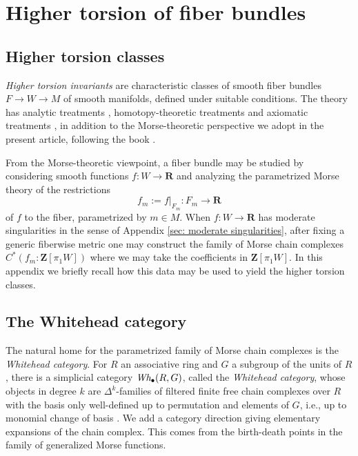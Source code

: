\documentclass{amsart}
\def\bR{\mathbf{R}}
\def\bZ{\mathbf{Z}}
\theoremstyle{definition}
\theoremstyle{remark}
\newtheorem{inductive lemma}[theorem]{Inductive Lemma}
\begin{document}
\section{Higher torsion of fiber bundles}\label{sec: higher torsion of bundles}


\subsection{Higher torsion classes}


{\em Higher torsion invariants} are characteristic classes of smooth fiber bundles $F \to W \to M$ of smooth manifolds, defined under suitable conditions. The theory has analytic treatments \cite{BL95, BG01}, homotopy-theoretic treatments \cite{DWW03} and axiomatic treatments \cite{Igu08}, in addition to the Morse-theoretic perspective we adopt in the present article, following the book \cite{I02}. 


From the Morse-theoretic viewpoint, a fiber bundle may be studied by considering smooth functions $f:W \to \bR$ and analyzing the parametrized Morse theory of the restrictions $$f_m:=f|_{F_m}: F_m \to \bR$$ of $f$ to the fiber, parametrized by $m \in M$. When $f:W \to \bR$ has moderate singularities in the sense of Appendix \ref{sec: moderate singularities}, after fixing a generic fiberwise metric one may construct the family of Morse chain complexes $C^*(f_m:\bZ[\pi_1W])$ where we may take the coefficients in $\bZ[\pi_1 W]$. In this appendix we briefly recall how this data may be used to yield the higher torsion classes. 


\subsection{The Whitehead category} 
The natural home for the parametrized family of Morse chain complexes is the {\em Whitehead category}. For $R$ an associative ring and $G$ a subgroup of the units of $R$, there is a simplicial category $ \text{\em Wh}_\bullet(R,G)$, called the {\em Whitehead category}, whose objects in degree $k$ are $\Delta^k$-families of filtered finite free chain complexes over $R$ with the basis only well-defined up to permutation and elements of $G$, i.e., up to monomial change of basis \cite[Def 2.7, Def 2.16]{I05}. We add a category direction giving elementary expansions of the chain complex. This comes from the birth-death points in the family of generalized Morse functions.
\end{document}

